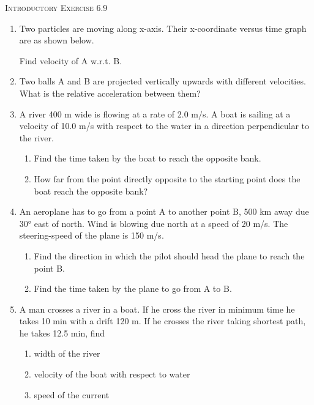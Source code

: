 \documentclass{article}
\begin{document}
\vspace*{10 mm}
\begin{center}
    \textsc{Introductory Exercise 6.9}
\end{center}
\begin{enumerate}
    \item Two particles are moving along x-axis. Their x-coordinate versus time graph are as shown below.
    
    
    Find velocity of A w.r.t. B.
  
    \item Two balls A and B are projected vertically upwards with different velocities. What is the relative acceleration between them?
  
    \item A river 400 m wide is flowing at a rate of 2.0 m/s. A boat is sailing at a velocity of 10.0 m/s with respect to the water in a direction perpendicular to the river. 
    \begin{enumerate}
      \item Find the time taken by the boat to reach the opposite bank.
      \item How far from the point directly opposite to the starting point does the boat reach the opposite bank?
    \end{enumerate}
  
    \item An aeroplane has to go from a point A to another point B, 500 km away due 30° east of north. Wind is blowing due north at a speed of 20 m/s. The steering-speed of the plane is 150 m/s.
    \begin{enumerate}
      \item Find the direction in which the pilot should head the plane to reach the point B.
      \item Find the time taken by the plane to go from A to B.
    \end{enumerate}
  
    \item A man crosses a river in a boat. If he cross the river in minimum time he takes 10 min with a drift 120 m. If he crosses the river taking shortest path, he takes 12.5 min, find
    \begin{enumerate}
      \item width of the river
      \item velocity of the boat with respect to water
      \item speed of the current
    \end{enumerate}
  

\end{enumerate}
\end{document}
